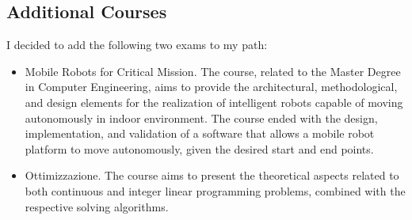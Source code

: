 \subsection{Additional Courses}
I decided to add the following two exams to my path:
\begin{itemize}
    \item Mobile Robots for Critical Mission. The course, related to the Master Degree in Computer Engineering, aims to provide the architectural, methodological, and design elements for the realization of intelligent robots capable of moving autonomously in indoor environment. The course ended with the design, implementation, and validation of a software that allows a mobile robot platform to move autonomously, given the desired start and end points.
    \item Ottimizzazione. The course aims to present the theoretical aspects related to both continuous and integer linear programming problems, combined with the respective solving algorithms. 
\end{itemize}
